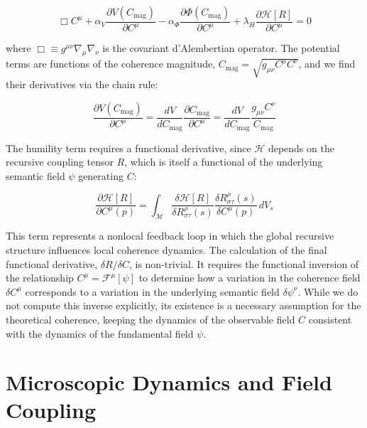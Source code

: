 \begin{equation}
\Box C^\mu + \alpha_V \frac{\partial V(C_{\mathrm{mag}})}{\partial C^\mu} - \alpha_\Phi \frac{\partial \Phi(C_{\mathrm{mag}})}{\partial C^\mu} + \lambda_H \frac{\partial \mathcal{H}[R]}{\partial C^\mu} = 0
\end{equation}

where \(\Box \equiv g^{\mu\nu}\nabla_\mu \nabla_\nu\) is the covariant d'Alembertian operator. The potential terms are functions of the coherence magnitude, \(C_{\text{mag}} = \sqrt{g_{\mu\nu} C^\mu C^\nu}\), and we find their derivatives via the chain rule:

\begin{equation}
\frac{\partial V(C_{\mathrm{mag}})}{\partial C^\mu} = \frac{dV}{dC_{\mathrm{mag}}} \frac{\partial C_{\mathrm{mag}}}{\partial C^\mu} = \frac{dV}{dC_{\mathrm{mag}}} \frac{g_{\mu\nu} C^\nu}{C_{\mathrm{mag}}}
\end{equation}

The humility term requires a functional derivative, since \(\mathcal{H}\) depends on the recursive coupling tensor \(R\), which is itself a functional of the underlying semantic field \(\psi\) generating \(C\):

\begin{equation}
\frac{\partial \mathcal{H}[R]}{\partial C^\mu(p)} = \int_{\mathcal{M}} \frac{\delta \mathcal{H}[R]}{\delta R^\rho_{\sigma\tau}(s)} \frac{\delta R^\rho_{\sigma\tau}(s)}{\delta C^\mu(p)} \, dV_s
\end{equation}

This term represents a nonlocal feedback loop in which the global recursive structure influences local coherence dynamics. The calculation of the final functional derivative, \(\delta R / \delta C\), is non-trivial. It requires the functional inversion of the relationship \(C^\mu = \mathcal{F}^\mu[\psi]\) to determine how a variation in the coherence field \(\delta C^\mu\) corresponds to a variation in the underlying semantic field \(\delta \psi^\nu\). While we do not compute this inverse explicitly, its existence is a necessary assumption for the theoretical coherence, keeping the dynamics of the observable field \(C\) consistent with the dynamics of the fundamental field \(\psi\).


\section{Microscopic Dynamics and Field Coupling}
\label{6.5:microscopic_dynamics_and_field_coupling}

